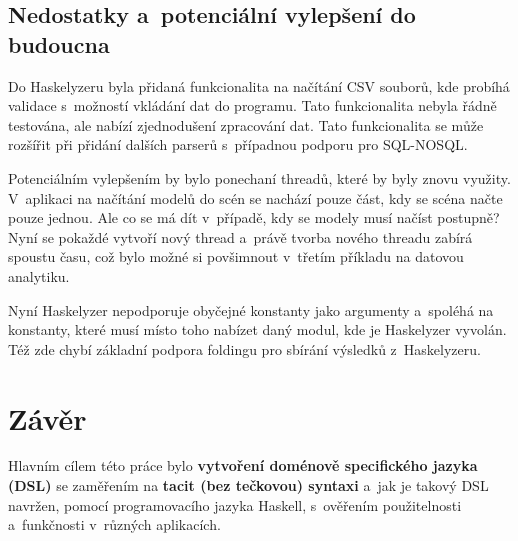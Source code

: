 \documentclass[male, czech]{kithesis}
\begin{document}
{\begin{center}
\end{center}
}

\section{Nedostatky a~potenciální vylepšení do budoucna}

Do Haskelyzeru byla přidaná funkcionalita na načítání CSV souborů,
kde probíhá validace s~možností vkládání dat do programu.
Tato funkcionalita nebyla řádně testována, 
ale nabízí zjednodušení zpracování dat.
Tato funkcionalita se může rozšířit při přidání dalších parserů 
s~případnou podporu pro SQL-NOSQL.
\newpage

Potenciálním vylepšením by bylo ponechaní threadů, 
které by byly znovu využity.
V~aplikaci na načítání modelů do scén se nachází pouze část,
kdy se scéna načte pouze jednou.
Ale co se má dít v~případě, 
kdy se modely musí načíst postupně?
Nyní se pokaždé vytvoří nový thread
a~právě tvorba nového threadu zabírá spoustu času,
což bylo možné si povšimnout v~třetím příkladu na datovou analytiku.

Nyní Haskelyzer nepodporuje obyčejné konstanty jako argumenty
a~spoléhá na konstanty,
které musí místo toho nabízet daný modul, 
kde je Haskelyzer vyvolán.
Též zde chybí základní podpora foldingu pro sbírání výsledků z~Haskelyzeru.

\chapter{Závěr}
Hlavním cílem této práce bylo \textbf{vytvoření doménově specifického jazyka (DSL)} se zaměřením 
na \textbf{tacit (bez tečkovou) syntaxi}
a~jak je takový DSL navržen, 
pomocí programovacího jazyka Haskell, 
s~ověřením použitelnosti a~funkčnosti v~různých aplikacích.
\end{document}
